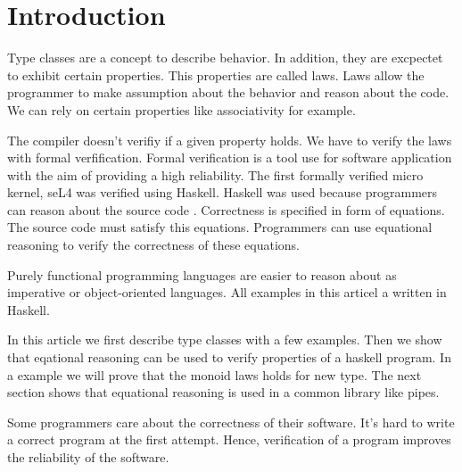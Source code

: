 \section{Introduction}
\label{sec:intro}

Type classes are a concept to describe behavior. In addition, they are excpectet to exhibit certain properties. This properties are called laws. 
Laws allow the programmer to make assumption about the behavior and reason about the code. We can rely on certain properties like associativity for example.

The compiler doesn't verifiy if a given property holds. We have to verify the laws with formal verfification. Formal verification is a tool use for software application with the aim of providing a high reliability. The first formally verified micro kernel, seL4 was verified using Haskell. Haskell was used because programmers can reason about the source code \cite{Klein09}. Correctness is specified in form of equations. The source code must satisfy this equations. Programmers can use equational reasoning to verify the correctness of these equations.

Purely functional programming languages are easier to reason about as imperative or object-oriented languages. All examples in this articel a written in Haskell.

In this article we first describe type classes with a few examples. Then we show that eqational reasoning can be used to verify properties of a haskell program. In a example we will prove that the monoid laws holds for new type. The next section shows that equational reasoning is used in a common library like pipes.


Some programmers care about the correctness of their software. It's hard to write a correct program at the first attempt. 
Hence, verification of a program improves the reliability of the software. 